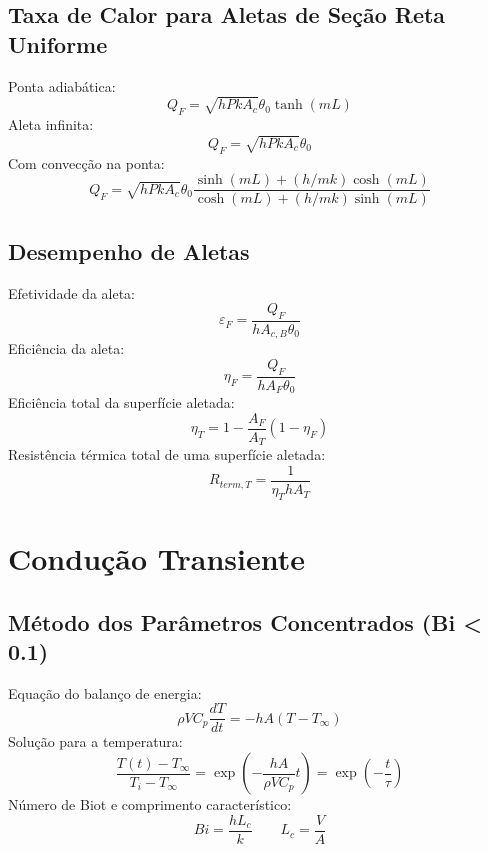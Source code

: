 \documentclass[12pt, a4paper]{article}
\begin{document}
\subsection{Taxa de Calor para Aletas de Seção Reta Uniforme}
Ponta adiabática:
\begin{equation}
    Q_F = \sqrt{hPkA_c} \theta_0 \tanh(mL)
\end{equation}
Aleta infinita:
\begin{equation}
    Q_F = \sqrt{hPkA_c} \theta_0
\end{equation}
Com convecção na ponta:
\begin{equation}
    Q_F = \sqrt{hPkA_c}\theta_0 \frac{\sinh(mL) + (h/mk)\cosh(mL)}{\cosh(mL) + (h/mk)\sinh(mL)}
\end{equation}

\subsection{Desempenho de Aletas}
Efetividade da aleta:
\begin{equation}
    \varepsilon_F = \frac{Q_F}{h A_{c,B} \theta_0}
\end{equation}
Eficiência da aleta:
\begin{equation}
    \eta_F = \frac{Q_F}{h A_F \theta_0}
\end{equation}
Eficiência total da superfície aletada:
\begin{equation}
    \eta_T = 1 - \frac{A_F}{A_T}(1 - \eta_F)
\end{equation}
Resistência térmica total de uma superfície aletada:
\begin{equation}
    R_{term,T} = \frac{1}{\eta_T h A_T}
\end{equation}

\newpage

\section{Condução Transiente}

\subsection{Método dos Parâmetros Concentrados (Bi < 0.1)}
Equação do balanço de energia:
\begin{equation}
    \rho V C_p \frac{dT}{dt} = -hA(T-T_\infty)
\end{equation}
Solução para a temperatura:
\begin{equation}
    \frac{T(t) - T_\infty}{T_i - T_\infty} = \exp\left(-\frac{hA}{\rho V C_p}t\right) = \exp\left(-\frac{t}{\tau}\right)
\end{equation}
Número de Biot e comprimento característico:
\begin{equation}
    Bi = \frac{h L_c}{k} \qquad L_c = \frac{V}{A}
\end{equation}
\end{document}
